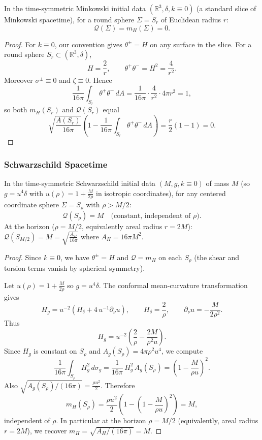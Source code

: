 \begin{proposition}
\label{prop:minkowski-test}
In the time-symmetric Minkowski initial data $(\mathbb{R}^3,\delta,k\equiv 0)$ (a standard slice of Minkowski spacetime), for a round sphere $\Sigma = S_r$ of Euclidean radius $r$:
\begin{equation}
\mathcal{Q}(\Sigma) = m_H(\Sigma) = 0.
\end{equation}
\end{proposition}

\begin{proof}
For $k\equiv 0$, our convention gives $\theta^\pm = H$ on any surface in the slice. For a round sphere $S_r \subset (\mathbb{R}^3,\delta)$,
\[
H = \frac{2}{r}, \qquad \theta^+\theta^- = H^2 = \frac{4}{r^2}.
\]
Moreover $\sigma^\pm \equiv 0$ and $\zeta \equiv 0$. Hence
\[
\frac{1}{16\pi}\int_{S_r} \theta^+\theta^-\, dA = \frac{1}{16\pi}\cdot \frac{4}{r^2}\cdot 4\pi r^2 = 1,
\]
so both $m_H(S_r)$ and $\mathcal{Q}(S_r)$ equal
\[
\sqrt{\frac{A(S_r)}{16\pi}}\left(1-\frac{1}{16\pi}\int_{S_r}\theta^+\theta^-\, dA\right)=\frac{r}{2}(1-1)=0.
\]
\end{proof}

\subsubsection{Schwarzschild Spacetime}

\begin{proposition}
\label{prop:schwarzschild-test}
In the time-symmetric Schwarzschild initial data $(M,g,k\equiv 0)$ of mass $M$ (so $g = u^4\delta$ with $u(\rho)=1+\frac{M}{2\rho}$ in isotropic coordinates), for any centered coordinate sphere $\Sigma = S_\rho$ with $\rho > M/2$:
\begin{equation}
\mathcal{Q}(S_\rho) = M \quad \text{(constant, independent of } \rho\text{)}.
\end{equation}
At the horizon ($\rho = M/2$, equivalently areal radius $r=2M$): $\mathcal{Q}(S_{M/2}) = M = \sqrt{\frac{A_H}{16\pi}}$ where $A_H = 16\pi M^2$.
\end{proposition}

\begin{proof}
Since $k\equiv 0$, we have $\theta^\pm = H$ and $\mathcal{Q}=m_H$ on each $S_\rho$ (the shear and torsion terms vanish by spherical symmetry).

Let $u(\rho)=1+\frac{M}{2\rho}$ so $g=u^4\delta$. The conformal mean-curvature transformation gives
\[
H_g = u^{-2}\left(H_\delta + 4\,u^{-1}\partial_\nu u\right), \qquad H_\delta=\frac{2}{\rho}, \qquad \partial_\nu u = -\frac{M}{2\rho^2}.
\]
Thus
\[
H_g = u^{-2}\left(\frac{2}{\rho}-\frac{2M}{\rho^2 u}\right).
\]
Since $H_g$ is constant on $S_\rho$ and $A_g(S_\rho)=4\pi\rho^2 u^4$, we compute
\[
\frac{1}{16\pi}\int_{S_\rho} H_g^2\, d\sigma_g
= \frac{1}{16\pi}\,H_g^2\,A_g(S_\rho)
= \left(1-\frac{M}{\rho u}\right)^2.
\]
Also $\sqrt{A_g(S_\rho)/(16\pi)} = \frac{\rho u^2}{2}$. Therefore
\[
m_H(S_\rho)=\frac{\rho u^2}{2}\left(1-\left(1-\frac{M}{\rho u}\right)^2\right)
= M,
\]
independent of $\rho$. In particular at the horizon $\rho=M/2$ (equivalently, areal radius $r=2M$), we recover $m_H=\sqrt{A_H/(16\pi)}=M$.
\end{proof}

